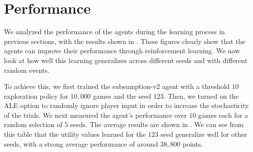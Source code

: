 \documentclass[journal,hidelinks]{IEEEtran}
\begin{document}
\section{Performance}

We analyzed the performance of the agents during the learning process in previous sections, with the results shown in . These figures clearly show that the agents can improve their performance through reinforcement learning. We now look at how well this learning generalizes across different seeds and with different random events.

To achieve this, we first trained the subsumption-v2 agent with a threshold $10$ exploration policy for $10,000$ games and the seed $123$. Then, we turned on the ALE option to randomly ignore player input in order to increase the stochasticity of the trials. We next measured the agent's performance over $10$ games each for a random selection of $5$ seeds. The average results are shown in . We can see from this table that the utility values learned for the $123$ seed generalize well for other seeds, with a strong average performance of around $38,800$ points.

\begin{table}[!htb]
	\centering
	\caption{Performance results for the subsumption-v2 agent with a threshold $10$ exploration policy after $10,000$ training games. The scores were averaged over $10$ games with the given seeds.}
	\label{tab:perf}
\end{table}
\end{document}
